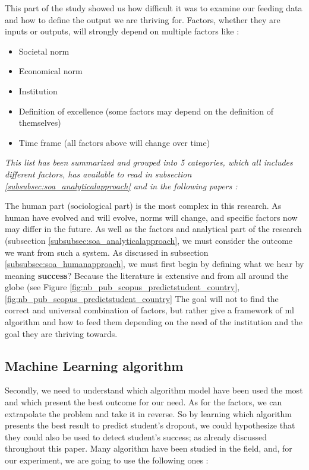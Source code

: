 \documentclass[../main.tex]{subfiles}
\begin{document}
This part of the study showed us how difficult it was to examine our feeding data and how to define the output we are thriving for. Factors, whether they are inputs or outputs, will strongly depend on multiple factors like :
\begin{itemize}
    \item Societal norm
    \item Economical norm
    \item Institution
    \item Definition of excellence (some factors may depend on the definition of themselves)
    \item Time frame (all factors above will change over time)
\end{itemize}

\textit{This list has been summarized and grouped into 5 categories, which all includes different factors, has available to read in subsection \ref{subsubsec:soa_analyticalapproach} and in the following papers : 
\cite{opazo_analysis_2021,tinto_dropout_1975,caspersen_teachers_2015,lidia_problema_2006,bejarano_caso_2017,sinchi_acceso_2018,cavero_voluntad_2011,velasco_alisis_nodate}}

The human part (sociological part) is the most complex in this research. As human have evolved and will evolve, norms will change, and specific factors now may differ in the future. 
As well as the factors and analytical part of the research (subsection \ref{subsubsec:soa_analyticalapproach}, we must consider the outcome we want from such a system. As discussed in subsection \ref{subsubsec:soa_humanapproach}, we must first begin by defining what we hear by meaning \textbf{success}? Because the literature is extensive and from all around the globe (see Figure \ref{fig:nb_pub_scopus_predictstudent_country}, \ref{fig:nb_pub_scopus_predictstudent_country}
The goal will not to find the correct and universal combination of factors, but rather give a framework of \acrshort{ml} algorithm and how to feed them depending on the need of the institution and the goal they are thriving towards.

\subsection{Machine Learning algorithm}
\label{subsec:analysis_mlalgo}
Secondly, we need to understand which algorithm model have been used the most and which present the best outcome for our need. As for the factors, we can extrapolate the problem and take it in reverse. So by learning which algorithm presents the best result to predict student's dropout, we could hypothesize that they could also be used to detect student's success; as already discussed throughout this paper. Many algorithm have been studied in the field, and, for our experiment, we are going to use the following ones : 
\end{document}
